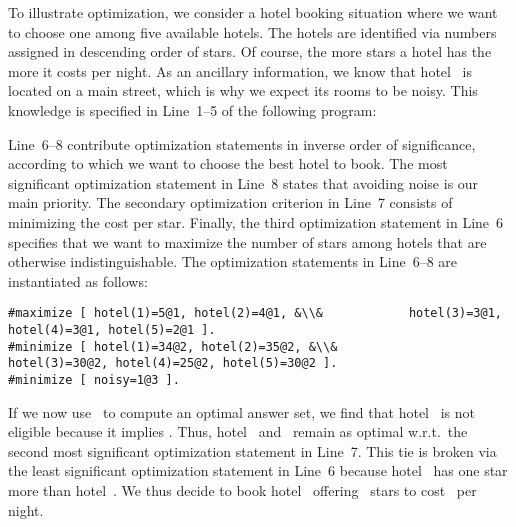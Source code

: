\begin{example}\label{ex:opt}
To illustrate optimization, we consider a hotel booking situation
where we want to choose one among five available hotels.
The hotels are identified via numbers assigned in descending order of stars.
Of course, the more stars a hotel has the more it costs per night.
As an ancillary information, we know that hotel~ is located
on a main street, which is why we expect its rooms to be noisy.
This knowledge is specified in Line~1--5 of the following program:
%

%
Line~6--8 contribute optimization statements in inverse order of significance,
according to which we want to choose the best hotel to book.
The most significant optimization statement in Line~8 states that
avoiding noise is our main priority.
The secondary optimization criterion in Line~7 consists of
minimizing the cost per star.
Finally, the third optimization statement in Line~6 specifies that we want
to maximize the number of stars among hotels that are otherwise indistinguishable.
The optimization statements in Line~6--8 are instantiated as follows:%
%
\begin{lstlisting}[firstnumber=6,breakindent=0pt,escapechar=&]
#maximize [ hotel(1)=5@1, hotel(2)=4@1, &\\&            hotel(3)=3@1, hotel(4)=3@1, hotel(5)=2@1 ].
#minimize [ hotel(1)=34@2, hotel(2)=35@2, &\\&            hotel(3)=30@2, hotel(4)=25@2, hotel(5)=30@2 ].
#minimize [ noisy=1@3 ].
\end{lstlisting}
If we now use \clasp\ to compute an optimal answer set,%
we find that hotel~ is not eligible because it implies .
Thus, hotel~ and~ remain as optimal w.r.t.\ the second most
significant optimization statement in Line~7.
This tie is broken via the least significant optimization statement in Line~6
because hotel~ has one star more than hotel~.
We thus decide to book hotel~ offering~ stars
to cost~ per night.
\eexample
\end{example}


